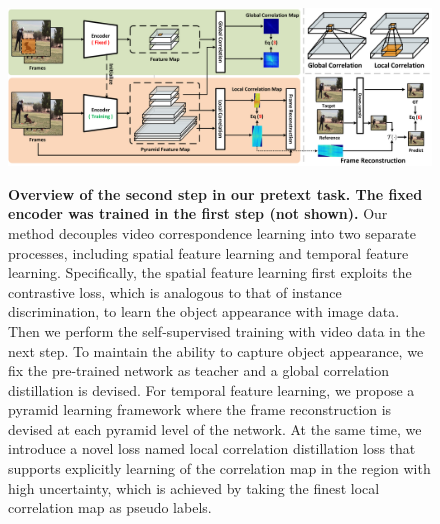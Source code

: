 \documentclass{article}
\begin{document}
\begin{figure}[!tb]
  \centering
  {\includegraphics[width=1.0\textwidth]{figure/framework/framework.pdf}}
  \caption{\small \textbf{Overview of the second step in our pretext task. The fixed encoder was trained in the first step (not shown).} Our method decouples video correspondence learning into two separate processes, including spatial feature learning and temporal feature learning. Specifically, the spatial feature learning first exploits the contrastive loss, which is analogous to that of instance discrimination, to learn the object appearance with image data. Then we perform the self-supervised training with video data in the next step. To maintain the ability to capture object appearance, we fix the pre-trained network as teacher and a global correlation distillation is devised. For temporal feature learning, we propose a pyramid learning framework where the frame reconstruction is devised at each pyramid level of the network. At the same time, we introduce a novel loss named local correlation distillation loss that supports explicitly learning of the correlation map in the region with high uncertainty, which is achieved by taking the finest local correlation map as pseudo labels.}
  \label{fig:framework}
  \vspace{-5mm}
\end{figure}
\end{document}
